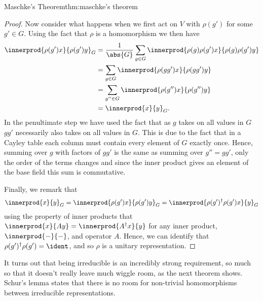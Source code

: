 \begin{thm}{Maschke's Theorem}{thm:maschke's theorem}
\begin{proof}
        Now consider what happens when we first act on \(V\) with
        \(\rho(g')\) for some \(g' \in G\).
        Using the fact that \(\rho\) is a homomorphism we then have
        \begin{align}
            \innerprod{\rho(g')x}{\rho(g')y}_G &= \frac{1}{\abs{G}} \sum_{g
                \in G} \innerprod{\rho(g)\rho(g')x}{\rho(g)\rho(g')y}\\
            &= \sum_{g\in G} \innerprod{\rho(gg')x}{\rho(gg')y}\\
            &= \sum_{g''\in G} \innerprod{\rho(g'')x}{\rho(g'')y}\\
            &= \innerprod{x}{y}_G.
        \end{align}
        In the penultimate step we have used the fact that as \(g\) takes on
        all values in \(G\) \(gg'\) necessarily also takes on all values in \(G\).
        This is due to the fact that in a Cayley table each column must
        contain every element of \(G\) exactly once.
        Hence, summing over \(g\) with factors of \(gg'\) is the same as
        summing over \(g'' = gg'\), only the order of the terms changes and since the
        inner product gives an element of the base field this sum is commutative.
        
        Finally, we remark that 
        \begin{equation}
            \innerprod{x}{y}_G = \innerprod{\rho(g')x}{\rho(g')y}_G =
            \innerprod{\rho(g')^\hermit \rho(g') x}{y}_G
        \end{equation}
        using the property of inner products that \(\innerprod{x}{Ay} =
        \innerprod{A^\hermit x}{y}\) for any inner product, \(\innerprod{-}{-}\), and
        operator \(A\).
        Hence, we can identify that \(\rho(g')^\hermit \rho(g') = \ident\),
        and so \(\rho\) is a unitary representation.
    \end{proof}
\end{thm}

It turns out that being irreducible is an incredibly strong requirement, so
much so that it doesn't really leave much wiggle room, as the next theorem
shows.
Schur's lemma states that there is no room for non-trivial homomorphisms
between irreducible representations.

